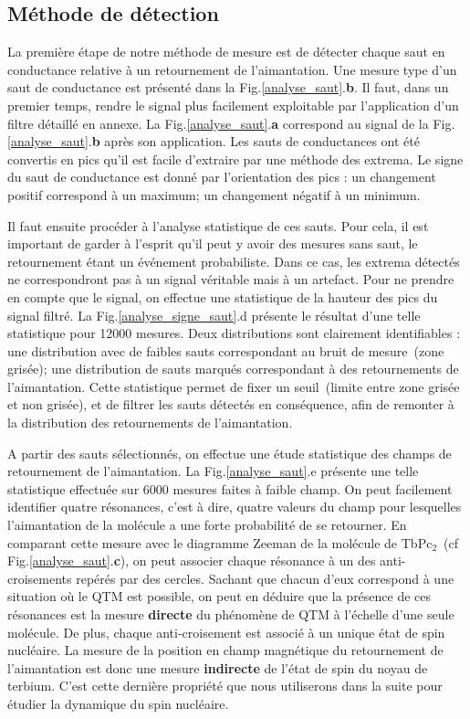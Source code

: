 \subsection{Méthode de détection}
La première étape de notre méthode de mesure est de détecter chaque saut en conductance relative à un retournement de l'aimantation. Une mesure type d'un saut de conductance est présenté dans la Fig.\ref{analyse_saut}.\textbf{b}. Il faut, dans un premier temps, rendre le signal plus facilement exploitable par l'application d'un filtre détaillé en annexe. La Fig.\ref{analyse_saut}.\textbf{a} correspond au signal de la Fig.\ref{analyse_saut}.\textbf{b} après son application. Les sauts de conductances ont été convertis en pics qu'il est facile d'extraire par une méthode des extrema. Le signe du saut de conductance est donné par l'orientation des pics : un changement positif correspond à un maximum; un changement négatif à un minimum.

Il faut ensuite procéder à l'analyse statistique de ces sauts. Pour cela, il est important de garder à l'esprit qu'il peut y avoir des mesures sans saut, le retournement étant un événement probabiliste. Dans ce cas, les extrema détectés ne correspondront pas à un signal véritable mais à un artefact. Pour ne prendre en compte que le signal, on effectue une statistique de la hauteur des pics du signal filtré. La Fig.\ref{analyse_signe_saut}.d présente le résultat d'une telle statistique pour 12000 mesures. Deux distributions sont clairement identifiables : une distribution avec de faibles sauts correspondant au bruit de mesure~(zone grisée); une distribution de sauts marqués correspondant à des retournements de l'aimantation. Cette statistique permet de fixer un seuil~(limite entre zone grisée et non grisée), et de filtrer les sauts détectés en conséquence, afin de remonter à la distribution des retournements de l'aimantation.

A partir des sauts sélectionnés, on effectue une étude statistique des champs de retournement de l'aimantation. La Fig.\ref{analyse_saut}.e présente une telle statistique effectuée sur 6000 mesures faites à faible champ. On peut facilement identifier quatre résonances, c'est à dire, quatre valeurs du champ pour lesquelles l'aimantation de la molécule a une forte probabilité de se retourner. En comparant cette mesure avec le diagramme Zeeman de la molécule de TbPc$_2$~(cf Fig.\ref{analyse_saut}.\textbf{c}), on peut associer chaque résonance à un des anti-croisements repérés par des cercles. Sachant que chacun d'eux correspond à une situation où le QTM est possible, on peut en déduire que la présence de ces résonances est la mesure \textbf{directe} du phénomène de QTM à l'échelle d'une seule molécule. De plus, chaque anti-croisement est associé à un unique état de spin nucléaire. La mesure de la position en champ magnétique du retournement de l'aimantation est donc une mesure \textbf{indirecte} de l'état de spin du noyau de terbium. C'est cette dernière propriété que nous utiliserons dans la suite pour étudier la dynamique du spin nucléaire.


